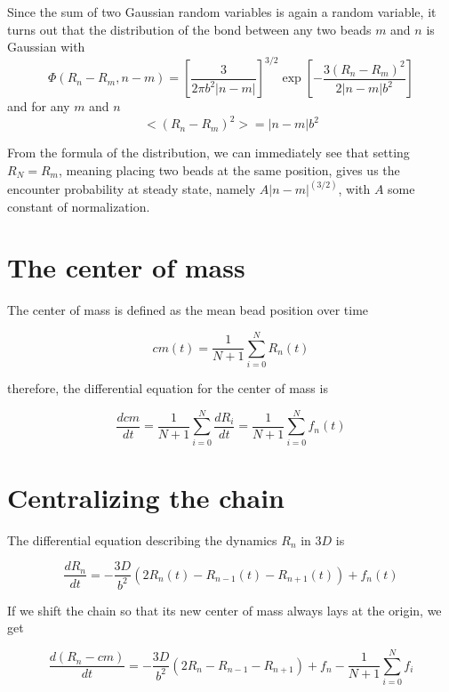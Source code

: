 \documentclass{paper}
\begin{document}
Since the sum of two Gaussian random variables is again a random variable, it turns out that the distribution of the bond between any two beads $m$ and $n$ is Gaussian with 
\begin{equation*}
\Phi(R_n-R_m,n-m)=\left[\frac{3}{2\pi b^2 |n-m|}\right]^{3/2}\exp \left[-\frac{3(R_n-R_m)^2}{2|n-m|b^2}\right]
\end{equation*}
and for any $m$ and $n$ 
\begin{equation*}
<(R_n-R_m)^2> = |n-m|b^2
\end{equation*}

From the formula of the distribution, we can immediately see that setting $R_N=R_m$, meaning placing two beads at the same position, gives us the encounter probability at steady state, namely $A|n-m|^(3/2)$, with $A$ some constant of normalization. 
\section{The center of mass}\label{section_theCenterOfMass}

The center of mass is defined as the mean bead position over time 

\begin{equation*}
cm(t) = \frac{1}{N+1}\sum_{i=0}^N{R_n(t)}
\end{equation*}

therefore, the differential equation for the center of mass is 

\begin{equation*}
\frac{dcm}{dt}=\frac{1}{N+1}\sum_{i=0}^N{\frac{dR_i}{dt}}= \frac{1}{N+1}\sum_{i=0}^Nf_n(t)
\end{equation*}

\section{Centralizing the chain}\label{section_centralizingTheChain}

The differential equation describing the dynamics $R_n$ in $3D$ is

\begin{equation*}
\frac{dR_n}{dt} = -\frac{3D}{b^2}\left(2R_n(t)-R_{n-1}(t)-R_{n+1}(t) \right)+f_n(t)
\end{equation*}

If we shift the chain so that its new center of mass always lays at the origin, we get 

 \begin{equation*}
\frac{d(R_n-cm)}{dt} = -\frac{3D}{b^2}\left(2R_n-R_{n-1}-R_{n+1} \right)+f_n-\frac{1}{N+1}\sum_{i=0}^Nf_i
\end{equation*}
\end{document}
